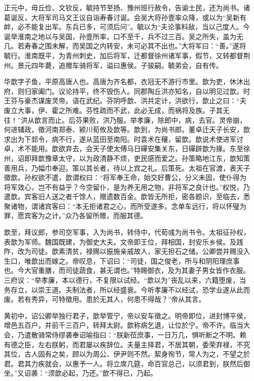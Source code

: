 \documentclass[12pt,UTF8]{ctexbook}
\begin{document}
正元中，毋丘俭、文钦反，毓持节至扬、豫州班行赦令，告谕士民，还为尚书。诸葛诞反，大将军司马文王议自诣寿春讨诞。会吴大将孙壹率众降，或以为“吴新有衅，必不能复出军。东兵已多，可须后问”。毓以为“夫论事料敌，当以己度人。今诞举淮南之地以与吴国，孙壹所率，口不至千，兵不过三百。吴之所失，盖为无几。若寿春之围未解，而吴国之内转安，未可必其不出也。”大将军曰：“善。”遂将毓行。淮南既平，为青州刺史，加后将军，迁都督徐州诸军事，假节，又转都督荆州。景元四年薨，追赠车骑将军，谥曰惠侯。子骏嗣。毓弟会，自有传。

华歆字子鱼，平原高唐人也。高唐为齐名都，衣冠无不游行市里。歆为吏，休沐出府，则归家阖门。议论持平，终不毁伤人。同郡陶丘洪亦知名，自以明见过歆。时王芬与豪杰谋废灵帝。语在武纪。芬阴呼歆、洪共定计，洪欲行，歆止之曰：“夫废立大事，伊、霍之所难。芬性疏而不武，此必无成，而祸将及族。子其无往！”洪从歆言而止。后芬果败，洪乃服。举孝廉，除郎中，病，去官。灵帝崩，何进辅政，徵河南郑泰、颍川荀攸及歆等。歆到，为尚书郎。董卓迁天子长安，歆求出为下邽令，病不行，遂从蓝田至南阳。时袁术在穰，留歆。歆说术使进军讨卓，术不能用。歆欲弃去，会天子使太傅马日磾安集关东，日磾辟歆为掾。东至徐州，诏即拜歆豫章太守，以为政清静不烦，吏民感而爱之。孙策略地江东，歆知策善用兵，乃幅巾奉迎。策以其长者，待以上宾之礼。后策死。太祖在官渡，表天子徵歆。孙权欲不遣，歆谓权曰：“将军奉王命，始交好曹公，分义未固，使仆得为将军效心，岂不有益乎？今空留仆，是为养无用之物，非将军之良计也。”权悦，乃遣歆。宾客旧人送之者千馀人，赠遗数百金。歆皆无所拒，密各题识，至临去，悉聚诸物，谓诸宾客曰：“本无拒诸君之心，而所受遂多。念单车远行，将以怀璧为罪，愿宾客为之计。”众乃各留所赠，而服其德。

歆至，拜议郎，参司空军事，入为尚书，转侍中，代荀彧为尚书令。太祖征孙权，表歆为军师。魏国既建，为御史大夫。文帝即王位，拜相国，封安乐乡侯。及践阼，改为司徒。歆素清贫，禄赐以振施亲戚故人，家无担石之储。公卿尝并赐没入生口，唯歆出而嫁之。帝叹息，下诏曰：“司徒，国之俊老，所与和阴阳理庶事也。今大官重膳，而司徒蔬食，甚无谓也。”特赐御衣，及为其妻子男女皆作衣服。三府议：“举孝廉，本以德行，不复限以试经。“歆以为”丧乱以来，六籍堕废，当务存立，以崇王道。夫制法者，所以经盛衰。今听孝廉不以经试，恐学业遂从此而废。若有秀异，可特徵用。患於无其人，何患不得哉？”帝从其言。

黄初中，诏公卿举独行君子，歆举管宁，帝以安车徵之。明帝即位，进封博平侯，增邑五百户，并前千三百户，转拜太尉。歆称病乞退，让位於宁。帝不许。临当大会，乃遣散骑常侍缪袭奉诏喻指曰：“朕新莅庶事，一日万几，惧听断之不明。赖有德之臣，左右朕躬，而君屡以疾辞位。夫量主择君，不居其朝，委荣弃禄，不究其位，古人固有之矣，顾以为周公、伊尹则不然。絜身徇节，常人为之，不望之於君。君其力疾就会，以惠予一人。将立席几筵，命百官总己，以须君到，朕然后御坐。”又诏袭：“须歆必起，乃还。”歆不得已，乃起。
\end{document}
